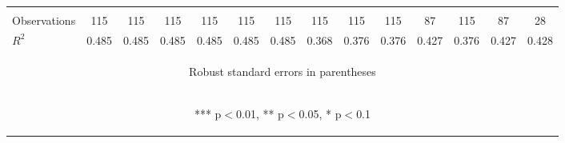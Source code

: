 \begin{center}
\begin{tabular}{lccccccccccccc}
\vspace{4pt} & \begin{footnotesize}\end{footnotesize} & \begin{footnotesize}\end{footnotesize} & \begin{footnotesize}\end{footnotesize} & \begin{footnotesize}\end{footnotesize} & \begin{footnotesize}\end{footnotesize} & \begin{footnotesize}\end{footnotesize} & \begin{footnotesize}\end{footnotesize} & \begin{footnotesize}\end{footnotesize} & \begin{footnotesize}\end{footnotesize} & \begin{footnotesize}\end{footnotesize} & \begin{footnotesize}\end{footnotesize} & \begin{footnotesize}\end{footnotesize} & \begin{footnotesize}\end{footnotesize} \\
Observations & 115 & 115 & 115 & 115 & 115 & 115 & 115 & 115 & 115 & 87 & 115 & 87 & 28 \\
 $R^2$ & 0.485 & 0.485 & 0.485 & 0.485 & 0.485 & 0.485 & 0.368 & 0.376 & 0.376 & 0.427 & 0.376 & 0.427 & 0.428 \\ \hline
\multicolumn{14}{c}{\begin{footnotesize} Robust standard errors in parentheses\end{footnotesize}} \\
\multicolumn{14}{c}{\begin{footnotesize} *** p$<$0.01, ** p$<$0.05, * p$<$0.1\end{footnotesize}} \\
\end{tabular}
\end{center}
